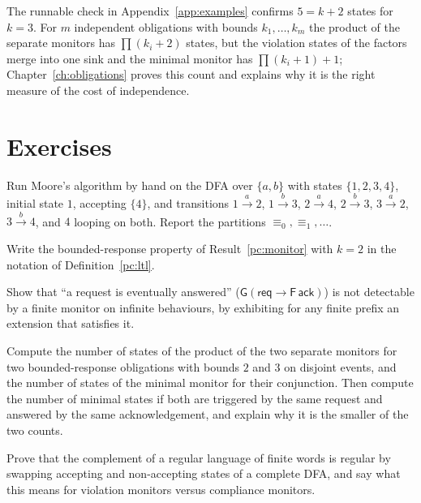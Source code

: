 The runnable check in Appendix~\ref{app:examples} confirms $5=k+2$ states for $k=3$. For $m$ independent obligations with bounds $k_1,\dots,k_m$ the product of the separate monitors has $\prod(k_i+2)$ states, but the violation states of the factors merge into one sink and the minimal monitor has $\prod(k_i+1)+1$; Chapter~\ref{ch:obligations} proves this count and explains why it is the right measure of the cost of independence.

\section*{Exercises}

\begin{exercise}
Run Moore's algorithm by hand on the DFA over $\{a,b\}$ with states $\{1,2,3,4\}$, initial state $1$, accepting $\{4\}$, and transitions $1\xrightarrow{a}2$, $1\xrightarrow{b}3$, $2\xrightarrow{a}4$, $2\xrightarrow{b}3$, $3\xrightarrow{a}2$, $3\xrightarrow{b}4$, and $4$ looping on both. Report the partitions $\equiv_0,\equiv_1,\dots$.
\end{exercise}

\begin{exercise}
Write the bounded-response property of Result~\ref{pc:monitor} with $k=2$ in the notation of Definition~\ref{pc:ltl}.
\end{exercise}

\begin{exercise}
Show that ``a request is eventually answered'' ($\mathsf G(\mathsf{req}\to\mathsf F\,\mathsf{ack})$) is not detectable by a finite monitor on infinite behaviours, by exhibiting for any finite prefix an extension that satisfies it.
\end{exercise}

\begin{exercise}
Compute the number of states of the product of the two separate monitors for two bounded-response obligations with bounds $2$ and $3$ on disjoint events, and the number of states of the minimal monitor for their conjunction. Then compute the number of minimal states if both are triggered by the same request and answered by the same acknowledgement, and explain why it is the smaller of the two counts.
\end{exercise}

\begin{exercise}
Prove that the complement of a regular language of finite words is regular by swapping accepting and non-accepting states of a complete DFA, and say what this means for violation monitors versus compliance monitors.
\end{exercise}
